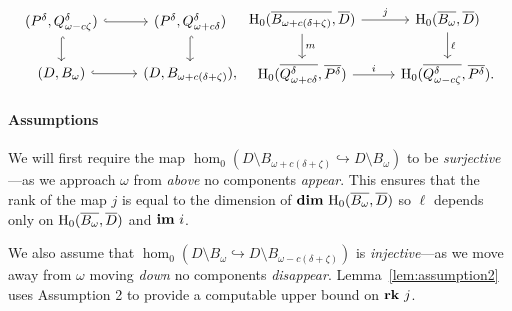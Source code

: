 
\begin{equation}\label{dgm:1}
\begin{tikzcd}
  (P^\of, \Q^\of) \arrow[hookrightarrow]{r}\arrow[hookrightarrow]{d} &
  (P^\of, \QQ^\of) \arrow[hookrightarrow]{d} \\
  (D, \bb) \arrow[hookrightarrow]{r} &
  (D, B_{\omega+c(\delta+\zeta)}),
\end{tikzcd}
\begin{tikzcd}
  \hom_0(\cmp{B_{\omega+c(\delta+\zeta)}},\cmp{D})\arrow{d}{m} \arrow{r}{j} &
  \hom_0(\cmp{\bb}, \cmp{D}) \arrow{d}{\ell} \\
  \hom_0(\cmp{\QQ^\of}, \cmp{P^\of}) \arrow{r}{i} &
  \hom_0(\cmp{\Q^\of}, \cmp{P^\of}).
\end{tikzcd}\end{equation}

\paragraph*{Assumptions}

We will first require the map $\hom_0(D\setminus B_{\omega+c(\delta+\zeta)}\hookrightarrow D\setminus B_\omega)$ to be \emph{surjective}---as we approach $\omega$ from \emph{above} no components \emph{appear}.
This ensures that the rank of the map $j$ is equal to the dimension of $\mathbf{dim}~\mathrm{H}_0(\overline{B_\omega}, \overline{D})$ so $\ell$ depends only on $\mathrm{H}_0(\overline{B_\omega}, \overline{D})$ and $\mathbf{im}~i$.

We also assume that $\hom_0(D\setminus B_\omega\hookrightarrow D\setminus B_{\omega-c(\delta+\zeta)})$ is \emph{injective}---as we move away from $\omega$ moving \emph{down} no components \emph{disappear}.
Lemma~\ref{lem:assumption2} uses Assumption 2 to provide a computable upper bound on $\mathbf{rk}~j$.%

